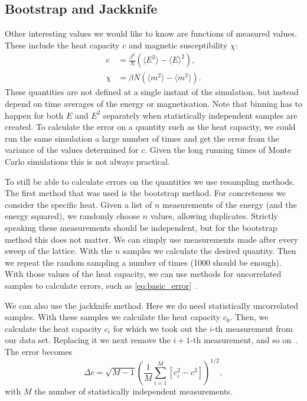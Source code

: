 \documentclass[11pt, a4paper]{report} %
\begin{document}
\subsection{Bootstrap and Jackknife}
Other interesting values we would like to know are functions of measured values.
These include the heat capacity \(c\) and magnetic susceptibility \(\chi\):
\begin{align}
	c &= \frac{\beta^2}{N} \left(\langle E^2 \rangle - \langle E \rangle^2 \right), \\
	\chi &= \beta N \left( \langle m^2 \rangle - \langle m^2 \rangle \right).
\end{align}
These quantities are not defined at a single instant of the simulation, but instead depend on time averages of the energy or magnetisation.
Note that binning has to happen for both \(E\) and \(E^2\) separately when statistically independent samples are created.
To calculate the error on a quantity such as the heat capacity, we could run the same simulation a large number of times and get the error from the variance of the values determined for \(c\).
Given the long running times of Monte Carlo simulations this is not always practical.

To still be able to calculate errors on the quantities we use resampling methods.
The first method that was used is the bootstrap method.
For concreteness we consider the specific heat.
Given a list of \(n\) measurements of the energy (and the energy squared), we randomly choose \(n\) values, allowing duplicates.
Strictly speaking these measurements should be independent, but for the bootstrap method this does not matter.
We can simply use measurements made after every sweep of the lattice.
With the \(n\) samples we calculate the desired quantity.
Then we repeat the random sampling a number of times (1000 should be enough).
With those values of the heat capacity, we can use methods for uncorrelated samples to calculate errors, such as \cref{eq:basic_error}~\cite{newman:1999}.

We can also use the jackknife method.
Here we do need statistically uncorrelated samples.
With these samples we calculate the heat capacity \(c_0\).
Then, we calculate the heat capacity \(c_i\) for which we took out the \(i\)-th measurement from our data set.
Replacing it we next remove the \(i+1\)-th measurement, and so on~\cite{newman:1999}.
The error becomes~\cite{corboz}
\begin{equation}
	\Delta c = \sqrt{M-1}\left( \frac{1}{M} \sum_{i=1}^M \left[c_i^2 - c^2\right] \right)^{1/2},
\end{equation}
with \(M\) the number of statistically independent measurements.
\end{document}
